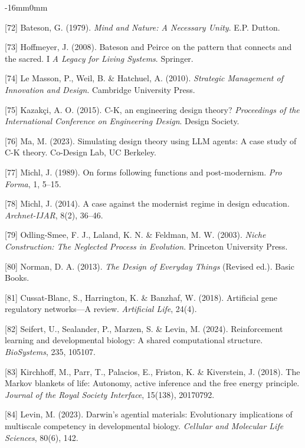 \documentclass[10pt,oneside]{book}
\newcommand{\refentry}[1]{%
  \par\addvspace{0pt}%
  \begingroup\footnotesize\linespread{0.92}\selectfont
  \noindent\hangindent=4mm\hangafter=1 #1\par%
  \endgroup
}
\newenvironment{widebody}{%
  \begin{adjustwidth}{-16mm}{0mm}%
}{%
  \end{adjustwidth}%
}
\begin{document}
\begin{widebody}
\refentry{[72] Bateson, G. (1979). \textit{Mind and Nature: A Necessary Unity}. E.P. Dutton.}
\refentry{[73] Hoffmeyer, J. (2008). Bateson and Peirce on the pattern that connects and the sacred. I \textit{A Legacy for Living Systems}. Springer.}
\refentry{[74] Le Masson, P., Weil, B. \& Hatchuel, A. (2010). \textit{Strategic Management of Innovation and Design}. Cambridge University Press.}
\refentry{[75] Kazakçi, A. O. (2015). C-K, an engineering design theory? \textit{Proceedings of the International Conference on Engineering Design}. Design Society.}
\refentry{[76] Ma, M. (2023). Simulating design theory using LLM agents: A case study of C-K theory. Co-Design Lab, UC Berkeley.}
\refentry{[77] Michl, J. (1989). On forms following functions and post-modernism. \textit{Pro Forma}, 1, 5--15.}
\refentry{[78] Michl, J. (2014). A case against the modernist regime in design education. \textit{Archnet-IJAR}, 8(2), 36--46.}
\refentry{[79] Odling-Smee, F. J., Laland, K. N. \& Feldman, M. W. (2003). \textit{Niche Construction: The Neglected Process in Evolution}. Princeton University Press.}
\refentry{[80] Norman, D. A. (2013). \textit{The Design of Everyday Things} (Revised ed.). Basic Books.}
\refentry{[81] Cussat-Blanc, S., Harrington, K. \& Banzhaf, W. (2018). Artificial gene regulatory networks---A review. \textit{Artificial Life}, 24(4).}
\refentry{[82] Seifert, U., Sealander, P., Marzen, S. \& Levin, M. (2024). Reinforcement learning and developmental biology: A shared computational structure. \textit{BioSystems}, 235, 105107.}
\refentry{[83] Kirchhoff, M., Parr, T., Palacios, E., Friston, K. \& Kiverstein, J. (2018). The Markov blankets of life: Autonomy, active inference and the free energy principle. \textit{Journal of the Royal Society Interface}, 15(138), 20170792.}
\refentry{[84] Levin, M. (2023). Darwin's agential materials: Evolutionary implications of multiscale competency in developmental biology. \textit{Cellular and Molecular Life Sciences}, 80(6), 142.}
\end{widebody}
\end{document}
